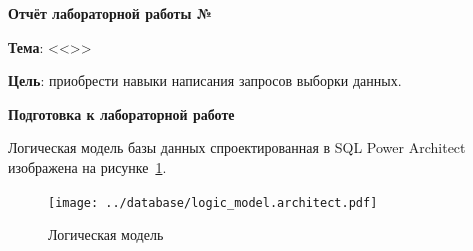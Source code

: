 \begin{center}
  \textbf{Отчёт лабораторной работы №\envReportLabNumber}
\end{center}

\textbf{Тема}:
<<\envReportTitle>>

\textbf{Цель}: приобрести навыки написания запросов выборки данных.


\begin{center}
  \textbf{Подготовка к лабораторной работе}
\end{center}


Логическая модель базы данных спроектированная в SQL Power Architect изображена на рисунке~\ref{fig:database}.

\begin{figure}[!h]
  \centering

  \texttt{[image: ../database/logic\_model.architect.pdf]}

  \caption{Логическая модель}

  \label{fig:database}
\end{figure}



